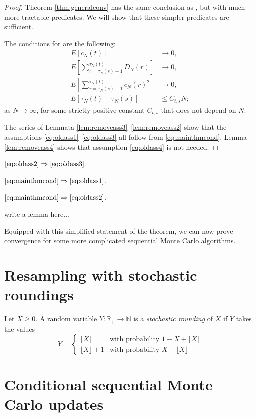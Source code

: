 \documentclass[lineno]{biometrika}
\begin{document}
\begin{proof}
Theorem \ref{thm:generalconv} has the same conclusion as \citet[Theorem 1]{koskela2018}, but with much more tractable predicates. We will show that these simpler predicates are sufficient.

The conditions for \citet[Theorem 1]{koskela2018} are the following:
\begin{align}
E [c_N(t)] &\rightarrow 0 , \label{eq:oldass1}\\
E \left[ \sum_{ r = \tau_N( s ) + 1 }^{ \tau_N( t ) } D_N( r ) \right] &\rightarrow 0, \label{eq:oldass2}\\
E \left[ \sum_{ r = \tau_N( s ) + 1 }^{ \tau_N( t ) } c_N( r )^2 \right] &\rightarrow 0 , \label{eq:oldass3}\\
E [\tau_N(t) - \tau_N(s)] &\leq C_{t,s} N; \label{eq:oldass4}
\end{align}
as $N\to\infty$, for some strictly positive constant $C_{t,s}$ that does not depend on $N$.

The series of Lemmata \ref{lem:removeass3}--\ref{lem:removeass2} show that the assumptions \eqref{eq:oldass1}--\eqref{eq:oldass3} all follow from \eqref{eq:mainthmcond}.
Lemma \ref{lem:removeass4} shows that assumption \eqref{eq:oldass4} is not needed.
\end{proof}

\begin{lemma} \label{lem:removeass3}
$\eqref{eq:oldass2} \Rightarrow \eqref{eq:oldass3}$.
\end{lemma}

\begin{lemma} \label{lem:removeass1}
$\eqref{eq:mainthmcond} \Rightarrow \eqref{eq:oldass1}$.
\end{lemma}

\begin{lemma} \label{lem:removeass2}
$\eqref{eq:mainthmcond} \Rightarrow \eqref{eq:oldass2}$.
\end{lemma}

\begin{lemma}\label{lem:removeass4}
write a lemma here...
\end{lemma}

Equipped with this simplified statement of the theorem, we can now prove convergence for some more complicated sequential Monte Carlo algorithms.

\section{Resampling with stochastic roundings}
\begin{definition}\label{defn:randround_1D}
Let $X\geq 0$. A random variable $Y: \mathbb{R}_+ \to \mathbb{N}$ is a \emph{stochastic rounding} of $X$ if $Y$ takes the values
\begin{equation*}
Y=
\begin{cases}
 \lfloor X \rfloor & \text{with probability } 1- X+ \lfloor X \rfloor \\
  \lfloor X \rfloor +1 & \text{with probability } X- \lfloor X \rfloor 
\end{cases}
\end{equation*}
\end{definition}


\section{Conditional sequential Monte Carlo updates}




\end{document}
